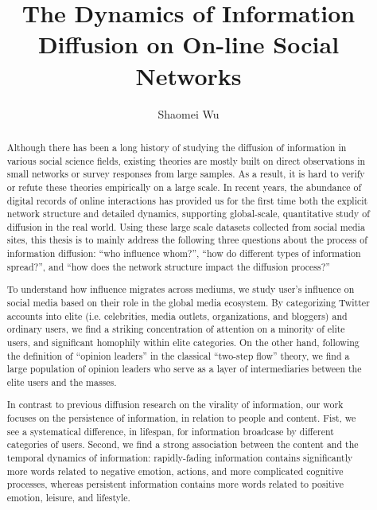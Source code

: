 \documentclass[phd,tocprelim]{cornell}
\title {The Dynamics of Information Diffusion on On-line Social Networks}
\author {Shaomei Wu}
\begin{document}
\maketitle
\makecopyright

\begin{abstract}
Although there has been a long history of studying the diffusion of information in various social science fields, existing theories are mostly built on direct observations in small networks or survey responses from large samples. As a result, it is hard to verify or refute these theories empirically on a large scale. In recent years, the abundance of digital records of online interactions has provided us for the first time both the explicit network structure and detailed dynamics, supporting global-scale, quantitative study of diffusion in the real world. Using these large scale datasets collected from social media sites, this thesis is to mainly address the following three questions about the process of information diffusion: ``who influence whom?'',  ``how do different types of information spread?'',  and ``how does the network structure impact the diffusion process?'' 

To understand how influence migrates across mediums, we study user's influence on social media based on their role in the global media ecosystem. By categorizing Twitter accounts into elite (i.e. celebrities, media outlets, organizations, and bloggers) and ordinary users, we find a striking concentration of attention on a minority of elite users, and significant homophily within elite categories. On the other hand, following the definition of ``opinion leaders'' in the classical ``two-step flow'' theory, we find a large population of opinion leaders who serve as a layer of intermediaries between the elite users and the masses. 

In contrast to previous diffusion research on the virality of information, our work focuses on the persistence of information, in relation to people and content. Fist, we see a systematical difference, in lifespan, for information broadcase by different categories of users. Second, we find a strong association between the content and the temporal dynamics of information: rapidly-fading information contains significantly more words related to negative emotion, actions, and more complicated cognitive processes, whereas persistent information contains more words related to positive emotion, leisure, and lifestyle.
 

\end{abstract}
\end{document}

